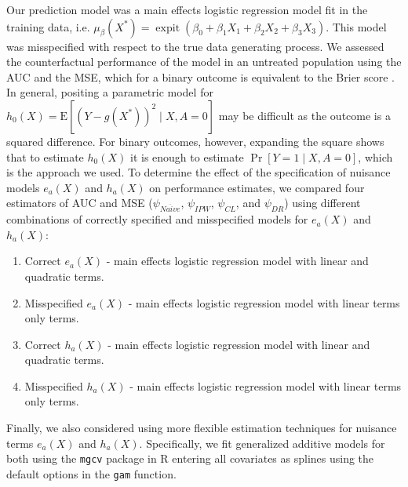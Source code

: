 Our prediction model was a main effects logistic regression model fit in the training data, i.e. $\mu_\beta\left(X^*\right) = \operatorname{expit}(\beta_0 + \beta_1 X_1 + \beta_2 X_2 + \beta_3 X_3)$. This model was misspecified with respect to the true data generating process. We assessed the counterfactual performance of the model in an untreated population using the AUC and the MSE, which for a binary outcome is equivalent to the Brier score \cite{brier_verification_1950}. In general, positing a parametric model for $h_0(X)=\mathrm{E}[(Y-g\left(X^*\right))^2 \mid X, A=0]$ may be difficult as the outcome is a squared difference. For binary outcomes, however, expanding the square shows that to estimate $h_0(X)$ it is enough to estimate $\operatorname{Pr}[Y=1 \mid X, A=0]$, which is the approach we used. To determine the effect of the specification of nuisance models $e_a(X)$ and $h_a(X)$ on performance estimates, we compared four estimators of AUC and MSE (${\psi}_{Na\ddot{i}ve}$, ${\psi}_{IPW}$, ${\psi}_{CL}$, and ${\psi}_{DR}$) using different combinations of correctly specified and misspecified models for $e_a(X)$ and $h_a(X)$:
\begin{enumerate}
    \item Correct $e_a(X)$ - main effects logistic regression model with linear and quadratic terms.
    \item Misspecified $e_a(X)$ - main effects logistic regression model with linear terms only terms.
    \item Correct $h_a(X)$ - main effects logistic regression model with linear and quadratic terms.
    \item Misspecified $h_a(X)$ - main effects logistic regression model with linear terms only terms.
\end{enumerate}
Finally, we also considered using more flexible estimation techniques for nuisance terms $e_a(X)$ and $h_a(X)$. Specifically, we fit generalized additive models for both using the \texttt{mgcv} package in $\mathrm{R}$ entering all covariates as splines using the default options in the \texttt{gam} function.

